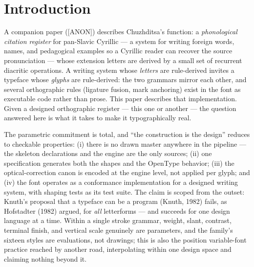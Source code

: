 \documentclass[12pt]{article}
\begin{document}
\begin{abstract}
\medskip
\noindent\textbf{Implications for practice.} The transferable content is a set of named rules with stated rationales: union overlapping outlines before emitting, because coverage-summing rasterizers darken every seam and even-odd consumers open white slits; ship pair kerning as GPOS, because the legacy kern table is ignored in CFF-flavored fonts; widen advances with weight, because advance width is a property of the counter, not the stroke; trim advances on open-sided letters, whose apertures recede; and derive every coordinate from the parameter sheet, so that a value which holds in only one style is exposed as a bug rather than shipped as a glyph. Treating optical corrections as engine-level arithmetic lets them generalize across a large character set at no marginal cost. For designers extending scripts for new orthographies, the executable-reference-implementation pattern — spelling rules compiled as OpenType lookups and verified by shaping assertions — makes orthographic claims mechanically testable.
\end{abstract}

\section{Introduction}

A companion paper ([ANON]) describes Chuzhditsa's function: a \emph{phonological citation register} for pan-Slavic Cyrillic — a system for writing foreign words, names, and pedagogical examples so a Cyrillic reader can recover the source pronunciation — whose extension letters are derived by a small set of recurrent diacritic operations. A writing system whose \emph{letters} are rule-derived invites a typeface whose \emph{glyphs} are rule-derived: the two grammars mirror each other, and several orthographic rules (ligature fusion, mark anchoring) exist in the font as executable code rather than prose. This paper describes that implementation. Given a designed orthographic register — this one or another — the question answered here is what it takes to make it typographically real.

The parametric commitment is total, and ``the construction is the design'' reduces to checkable properties: (i) there is no drawn master anywhere in the pipeline — the skeleton declarations and the engine are the only sources; (ii) one specification generates both the shapes and the OpenType behavior; (iii) the optical-correction canon is encoded at the engine level, not applied per glyph; and (iv) the font operates as a conformance implementation for a designed writing system, with shaping tests as its test suite. The claim is scoped from the outset: Knuth's proposal that a typeface can be a program (Knuth, 1982) fails, as Hofstadter (1982) argued, for \emph{all} letterforms — and succeeds for one design language at a time. Within a single stroke grammar, weight, slant, contrast, terminal finish, and vertical scale genuinely are parameters, and the family's sixteen styles are evaluations, not drawings; this is also the position variable-font practice reached by another road, interpolating within one design space and claiming nothing beyond it.
\end{document}
